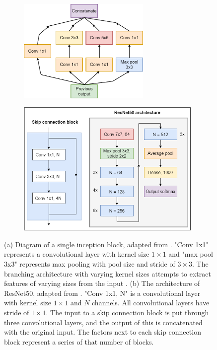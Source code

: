 \documentclass[12pt]{article}
\begin{document}
\begin{figure}[!h]
\centering
\begin{subfigure}{0.5\textwidth}
	\centering
	\hspace{-1cm}\includegraphics[width=2.5in]{images/inception_block.png}
	\caption{}
	\label{arch:inc}
\end{subfigure}%
\begin{subfigure}{0.5\textwidth}
	\centering
	\hspace{-1cm}\includegraphics[width=3.5in]{images/resnet50.png}
	\caption{}
	\label{arch:res}
\end{subfigure}
\caption{(a) Diagram of a single inception block, adapted from \cite{Szegedy15}. "Conv 		1x1" represents a convolutional layer with kernel size $1\times1$ and "max pool 3x3" represents max pooling with pool size and stride of $3\times3$. The branching architecture with varying kernel sizes attempts to extract features of varying sizes from the input \cite{Szegedy15}. 
(b) The architecture of ResNet50, adapted from \cite{He15}. "Conv 1x1, N" is a convolutional layer with kernel size $1\times1$ and $N$ channels. All convolutional layers have stride of $1\times1$. The input to a skip connection block is put through three convolutional layers, and the output of this is concatenated with the original input. The factors next to each skip connection block represent a series of that number of blocks.}
\label{arch:arch}
\end{figure}
\end{document}
